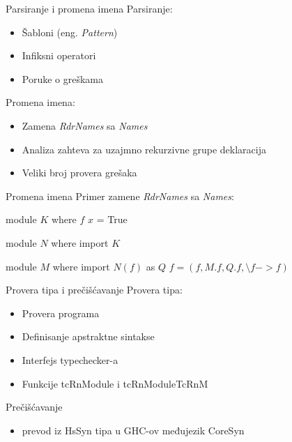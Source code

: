 \documentclass{beamer}
\begin{document}
\begin{frame}{Parsiranje i promena imena}
	Parsiranje:
	\begin{itemize}
		\item Šabloni (eng. \emph{Pattern})
		\item Infiksni operatori
		\item Poruke o greškama
	\end{itemize}	
	
	Promena imena:
	\begin{itemize}
		\item Zamena \textit{RdrNames} sa \textit{Names}
		\item Analiza zahteva za uzajmno rekurzivne grupe deklaracija
		\item Veliki broj provera grešaka
	\end{itemize}	

\end{frame}

\begin{frame}[fragile]{Promena imena}
	Primer zamene \textit{RdrNames} sa \textit{Names}:
	\begin{block}{}
		module $ K $ where
		$ f $ $ x $ = True
		
		module $ N $ where
		import $ K $
		
		module $ M $ where
		import $ N( f ) $ as $ Q $ 
		$f = (f, M.f, Q.f,  \setminus f  -> f) $
	\end{block}
\end{frame}

\begin{frame}{Provera tipa i prečišćavanje}
	Provera tipa:
	\begin{itemize}
		\item Provera programa
		\item Definisanje apstraktne sintakse
		\item Interfejs typechecker-a 
		\item Funkcije tcRnModule i tcRnModuleTcRnM 
	\end{itemize}
	
	\vspace{0.5cm}
	
	Prečišćavanje \begin{itemize}
		\item prevod iz HsSyn tipa u GHC-ov međujezik CoreSyn
	\end{itemize}
\end{frame}
\end{document}
